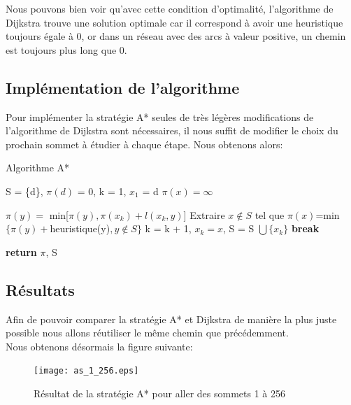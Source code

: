 \documentclass{article}
\begin{document}
Nous pouvons bien voir qu'avec cette condition d'optimalité, l'algorithme de Dijkstra trouve une solution
optimale car il correspond à avoir une heuristique toujours égale à 0, or dans un réseau avec des arcs
à valeur positive, un chemin est toujours plus long que 0.

\subsection{Implémentation de l'algorithme}

Pour implémenter la stratégie A* seules de très légères modifications de l'algorithme de Dijkstra sont
nécessaires, il nous suffit de modifier le choix du prochain sommet à étudier à chaque étape.
Nous obtenons alors:\\

\clearpage


\begin{algorithm}
\caption{Algorithme A*}\label{astar}
\begin{algorithmic}[1]
	\State S = \{d\}, $\pi(d)$ = 0, k = 1, $x_1$ = d
		\State $\pi(x) = \infty$
	\EndFor
	
			\State $\pi(y) = $ min[$\pi(y), \pi(x_k) + l(x_k, y)$]
		\EndFor
		\State Extraire $x \not\in S$ tel que $\pi(x)$=min$\{\pi(y)+$heuristique(y)$, y \not\in S\}$
		\State k = k + 1, $x_k = x$, S = S $\bigcup \{x_k\}$
			\State \textbf{break}
		\EndIf
	\EndWhile
	
	\State \textbf{return} $\pi$, S
\EndProcedure 
\end{algorithmic}
\end{algorithm}

\subsection{Résultats}

Afin de pouvoir comparer la stratégie A* et Dijkstra de manière la plus juste possible nous allons
réutiliser le même chemin que précédemment.\\

Nous obtenons désormais la figure suivante:\\

\begin{figure}[!hbt]
	\centering
		\texttt{[image: as\_1\_256.eps]}
	\caption{Résultat de la stratégie A* pour aller des sommets 1 à 256}
	\label{as_1}
\end{figure}
\end{document}
